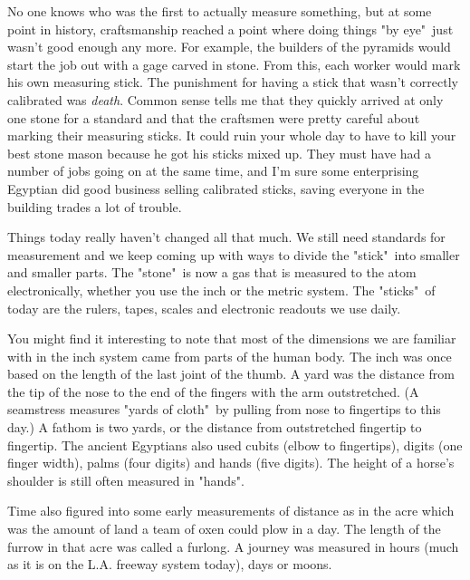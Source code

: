 \secdown


No one knows who was the first to actually measure something, but at some point
in history, craftsmanship reached a point where doing things "by eye"\ just
wasn't good enough any more. For example, the builders of the pyramids would
start the job out with a gage carved in stone. From this, each worker would mark
his own measuring stick. The punishment for having a stick that wasn't correctly
calibrated was \emph{death}. Common sense tells me that they quickly arrived at
only one stone for a standard and that the craftsmen were pretty careful about
marking their measuring sticks. It could ruin your whole day to have to kill
your best stone mason because he got his sticks mixed up. They must have had a
number of jobs going on at the same time, and I'm sure some enterprising
Egyptian did good business selling calibrated sticks, saving everyone in the
building trades a lot of trouble.


Things today really haven't changed all that much. We still need standards for
measurement and we keep coming up with ways to divide the "stick"\ into smaller
and smaller parts. The "stone"\ is now a gas that is measured to the atom
electronically, whether you use the inch or the metric system. The "sticks"\ of
today are the rulers, tapes, scales and electronic readouts we use daily.


You might find it interesting to note that most of the dimensions we are
familiar with in the inch system came from parts of the human body. The inch was
once based on the length of the last joint of the thumb. A yard was the distance
from the tip of the nose to the end of the fingers with the arm outstretched. (A
seamstress measures "yards of cloth"\ by pulling from nose to fingertips to this
day.) A fathom is two yards, or the distance from outstretched fingertip to
fingertip. The ancient Egyptians also used cubits (elbow to fingertips), digits
(one finger width), palms (four digits) and hands (five digits). The height of a
horse's shoulder is still often measured in "hands".

Time also figured into some early measurements of distance as in the acre which
was the amount of land a team of oxen could plow in a day. The length of the
furrow in that acre was called a furlong. A journey was measured in hours (much
as it is on the L.A. freeway system today), days or moons.

